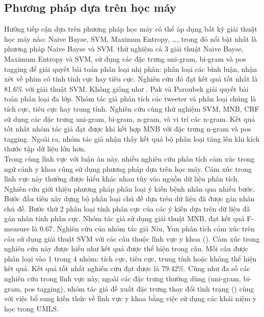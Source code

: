\subsection{Phương pháp dựa trên học máy}
Hướng tiếp cận dựa trên phương pháp học máy có thể áp dụng bất kỳ giải thuật học máy nào: Naive Bayse, SVM, Maximun Entropy, \ldots, trong đó nổi bật nhất là phương pháp Naive Bayse và SVM. \cite{pang2002thumbs} thử nghiệm cả 3 giải thuật Naive Bayse, Maximum Entropy và SVM, sử dụng các đặc trưng uni-gram, bi-gram và pos tagging để giải quyết bài toán phân loại nhị phân: phân loại các bình luận, nhận xét về phim có tính tính cực hay tiêu cực. Nghiên cứu đó đạt kết quả tốt nhất là 81.6\% với giải thuật SVM. Không giống như \cite{pang2002thumbs}, Pak và Paroubek giải quyết bài toán phân loại đa lớp. Nhóm tác giả phân tích các tweeter và phân loại chúng là tích cực, tiêu cực hay trung tính. Nghiên cứu cùng thử nghiệm SVM, MNB, CRF sử dụng các đặc trưng uni-gram, bi-gram, n-gram, và vị trí các n-gram. Kết quả tốt nhất nhóm tác giả đạt được khi kết hợp MNB với đặc trưng n-gram và pos tagging. Ngoài ra, nhóm tác giả nhận thấy kết quả bộ phân loại tăng lên khi kích thước tập dữ liệu lớn hơn.\\

Trong cùng lĩnh vực với luận án này, nhiều nghiên cứu phân tích cảm xúc trong ngữ cảnh y khoa cũng sử dụng phương pháp dựa trên học máy. Cảm xúc trong lĩnh vực này thường được hiểu khác nhau tùy vào nguồn dữ liệu phân tích.
Nghiên cứu \cite{xia09improving} giới thiệu phương pháp phân loại ý kiến bệnh nhân qua nhiều bước. Bước đầu tiên xây dựng bộ phân loại chủ đề dựa trên dữ liệu đã được gán nhãn chủ đề. Bước thứ 2 phân loại tính phân cực của các ý kiến dựa trên dữ liệu đã gán nhãn tính phân cực. Nhóm tác giả sử dụng giải thuật MNB, đạt kết quả F-measure là 0.67.
Nghiên cứu của nhóm tác giả Niu, Yun \cite{niu2005analysis} phân tích cảm xúc trên câu sử dụng giải thuật SVM với các câu thuộc lĩnh vực y khoa (). Cảm xúc trong nghiên cứu này được hiểu như kết quả  được thể hiện trong câu. Mỗi câu được phân loại vào 1 trong 4 nhóm: tích cực, tiêu cực, trung tính hoặc không thể hiện kết quả. Kết quả tốt nhất nghiên cứu đạt được là 79.42\%. Cũng như đa số các nghiên cứu trong lĩnh vực này, ngoài các đặc trưng thường dùng (uni-gram, bi-gram, pos tagging), nhóm tác giả đề xuất đặc trưng thay đổi tình trạng () cùng với việc bổ sung kiến thức về lĩnh vực y khoa bằng việc sử dụng các khái niệm y học trong UMLS. 
